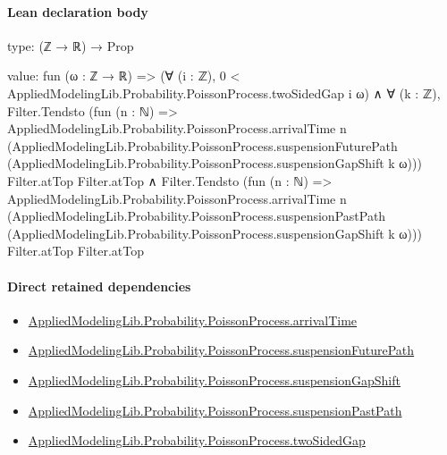 \documentclass[10pt]{article}
\begin{document}
\paragraph{Lean declaration body}
\begin{ReviewVerbatim}
type:
(ℤ → ℝ) → Prop

value:
fun (ω : ℤ → ℝ) =>
  (∀ (i : ℤ), 0 < AppliedModelingLib.Probability.PoissonProcess.twoSidedGap i ω) ∧
    ∀ (k : ℤ),
      Filter.Tendsto
          (fun (n : ℕ) =>
            AppliedModelingLib.Probability.PoissonProcess.arrivalTime n
              (AppliedModelingLib.Probability.PoissonProcess.suspensionFuturePath
                (AppliedModelingLib.Probability.PoissonProcess.suspensionGapShift k ω)))
          Filter.atTop Filter.atTop ∧
        Filter.Tendsto
          (fun (n : ℕ) =>
            AppliedModelingLib.Probability.PoissonProcess.arrivalTime n
              (AppliedModelingLib.Probability.PoissonProcess.suspensionPastPath
                (AppliedModelingLib.Probability.PoissonProcess.suspensionGapShift k ω)))
          Filter.atTop Filter.atTop
\end{ReviewVerbatim}

\paragraph{Direct retained dependencies}
\begin{itemize}\raggedright
\item \hyperlink{governing-declaration-544406615ce2d8dc}{Applied\allowbreak{}Modeling\allowbreak{}Lib.\allowbreak{}Probability.\allowbreak{}Poisson\allowbreak{}Process.\allowbreak{}arrival\allowbreak{}Time}
\item \hyperlink{governing-declaration-adb3b56227ee711d}{Applied\allowbreak{}Modeling\allowbreak{}Lib.\allowbreak{}Probability.\allowbreak{}Poisson\allowbreak{}Process.\allowbreak{}suspension\allowbreak{}Future\allowbreak{}Path}
\item \hyperlink{governing-declaration-3b441995d5597d49}{Applied\allowbreak{}Modeling\allowbreak{}Lib.\allowbreak{}Probability.\allowbreak{}Poisson\allowbreak{}Process.\allowbreak{}suspension\allowbreak{}Gap\allowbreak{}Shift}
\item \hyperlink{governing-declaration-5e8dbc9b6cbf2c33}{Applied\allowbreak{}Modeling\allowbreak{}Lib.\allowbreak{}Probability.\allowbreak{}Poisson\allowbreak{}Process.\allowbreak{}suspension\allowbreak{}Past\allowbreak{}Path}
\item \hyperlink{governing-declaration-3729a6ac90fa3324}{Applied\allowbreak{}Modeling\allowbreak{}Lib.\allowbreak{}Probability.\allowbreak{}Poisson\allowbreak{}Process.\allowbreak{}two\allowbreak{}Sided\allowbreak{}Gap}
\end{itemize}
\hypertarget{governing-declaration-ab1cfe37ad8c32b0}{}
\end{document}
